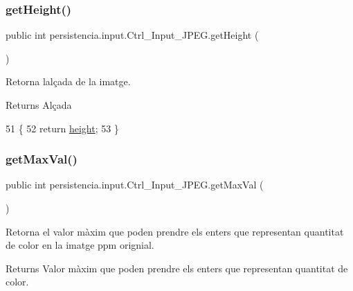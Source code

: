 \subsubsection{\texorpdfstring{get\+Height()}{getHeight()}}
{\footnotesize\ttfamily public int persistencia.\+input.\+Ctrl\+\_\+\+Input\+\_\+\+J\+P\+E\+G.\+get\+Height (\begin{DoxyParamCaption}{ }\end{DoxyParamCaption})\hspace{0.3cm}{\ttfamily [inline]}}



Retorna l\textquotesingle{}alçada de la imatge. 

\begin{DoxyReturn}{Returns}
Alçada 
\end{DoxyReturn}

\begin{DoxyCode}
51                            \{
52         \textcolor{keywordflow}{return} \hyperlink{classpersistencia_1_1input_1_1Ctrl__Input__JPEG_a9e6805b998e58981f8cd7b8b6e609f27}{height};
53     \}
\end{DoxyCode}
\mbox{\label{classpersistencia_1_1input_1_1Ctrl__Input__JPEG_a7c07d70b1dd3881e3322e9e3403e2ae7}} 
\subsubsection{\texorpdfstring{get\+Max\+Val()}{getMaxVal()}}
{\footnotesize\ttfamily public int persistencia.\+input.\+Ctrl\+\_\+\+Input\+\_\+\+J\+P\+E\+G.\+get\+Max\+Val (\begin{DoxyParamCaption}{ }\end{DoxyParamCaption})\hspace{0.3cm}{\ttfamily [inline]}}



Retorna el valor màxim que poden prendre els enters que representan quantitat de color en la imatge ppm orignial. 

\begin{DoxyReturn}{Returns}
Valor màxim que poden prendre els enters que representan quantitat de color. 
\end{DoxyReturn}

